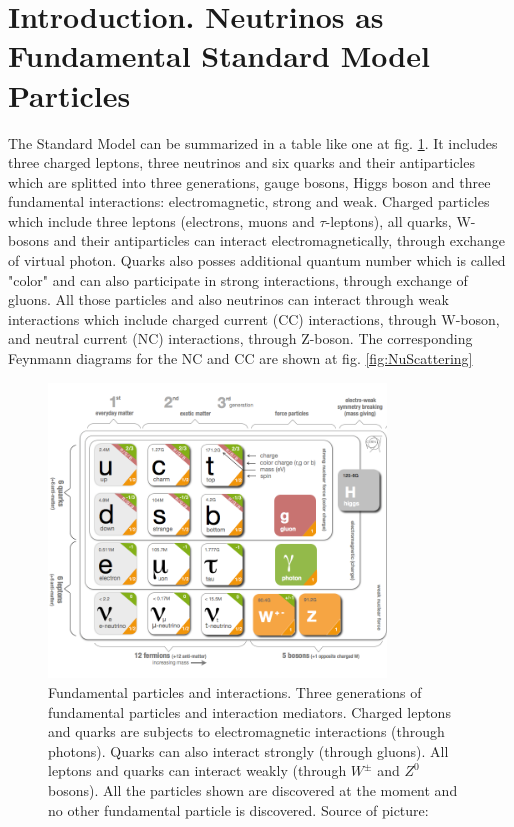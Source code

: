 \section{Introduction. Neutrinos as Fundamental Standard Model Particles}

The Standard Model can be summarized in a table like one at fig. \ref{fig:StandardModel}. It includes three charged leptons, three neutrinos and six quarks and their antiparticles which are splitted into three generations, gauge bosons, Higgs boson and three fundamental interactions: electromagnetic, strong and weak. Charged particles which include three leptons (electrons, muons and $\tau$-leptons), all quarks, W-bosons and their antiparticles can interact electromagnetically, through exchange of virtual photon. Quarks also posses additional quantum number which is called "color" and can also participate in strong interactions, through exchange of gluons. All those particles and also neutrinos can interact through weak interactions which include charged current (CC) interactions, through W-boson, and neutral current (NC) interactions, through Z-boson. The corresponding Feynmann diagrams for the NC and CC are shown at fig. \ref{fig:NuScattering}\\

\begin{figure}
\caption{Fundamental particles and interactions. Three generations of fundamental particles and interaction mediators. Charged leptons and quarks are subjects to electromagnetic interactions (through photons). Quarks can also interact strongly (through gluons). All leptons and quarks can interact weakly (through $W^{\pm}$ and $Z^0$ bosons). All the particles shown are discovered at the moment and no other fundamental particle is discovered. Source of picture: \cite{ref_fig_StandardModel}}
\label{fig:StandardModel}
\centering 
\includegraphics[width=0.8\textwidth, keepaspectratio=true]{figs/StandardModel.png}
\end{figure}

